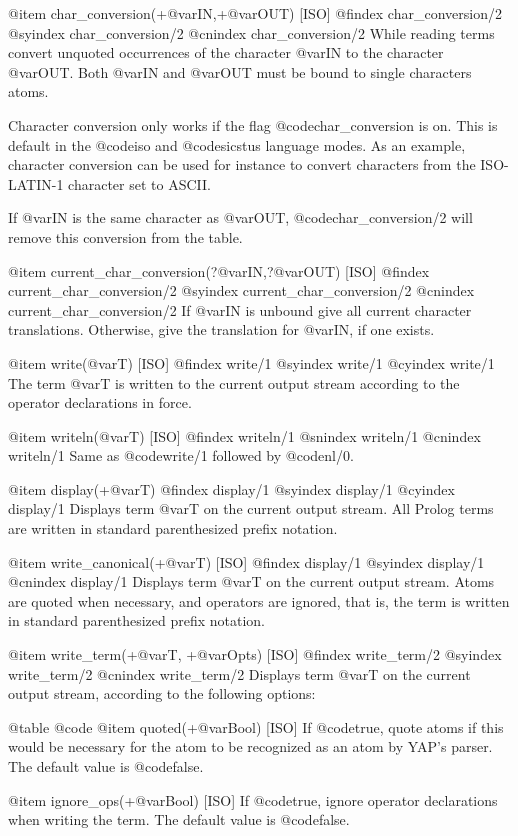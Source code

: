 {{{{{{@item char_conversion(+@var{IN},+@var{OUT}) [ISO]
@findex char_conversion/2
@syindex char_conversion/2
@cnindex char_conversion/2
While reading terms convert unquoted occurrences of the character
@var{IN} to the character @var{OUT}. Both @var{IN} and @var{OUT} must be
bound to single characters atoms.

Character conversion only works if the flag @code{char_conversion} is
on. This is default in the @code{iso} and @code{sicstus} language
modes. As an example, character conversion can be used for instance to
convert characters from the ISO-LATIN-1 character set to ASCII.

If @var{IN} is the same character as @var{OUT}, @code{char_conversion/2}
will remove this conversion from the table.

@item current_char_conversion(?@var{IN},?@var{OUT}) [ISO]
@findex current_char_conversion/2
@syindex current_char_conversion/2
@cnindex current_char_conversion/2
If @var{IN} is unbound give all current character
translations. Otherwise, give the translation for @var{IN}, if one
exists.

@item write(@var{T}) [ISO]
@findex write/1
@syindex write/1
@cyindex write/1
The term @var{T} is written to the current output stream according to
the operator declarations in force.

@item writeln(@var{T}) [ISO]
@findex writeln/1
@snindex writeln/1
@cnindex writeln/1
Same as @code{write/1} followed by @code{nl/0}.

@item display(+@var{T})
@findex display/1
@syindex display/1
@cyindex display/1
Displays term @var{T} on the current output stream. All Prolog terms are
written in standard parenthesized prefix notation.

@item write_canonical(+@var{T}) [ISO]
@findex display/1
@syindex display/1
@cnindex display/1
Displays term @var{T} on the current output stream. Atoms are quoted
when necessary, and operators are ignored, that is, the term is written
in standard parenthesized prefix notation.

@item write_term(+@var{T}, +@var{Opts}) [ISO]
@findex write_term/2
@syindex write_term/2
@cnindex write_term/2
Displays term @var{T} on the current output stream, according to the
following options:

@table @code
@item quoted(+@var{Bool}) [ISO]
If @code{true}, quote atoms if this would be necessary for the atom to
be recognized as an atom by YAP's parser. The default value is
@code{false}.

@item ignore_ops(+@var{Bool}) [ISO]
If @code{true}, ignore operator declarations when writing the term. The
default value is @code{false}.

}}}}}}
